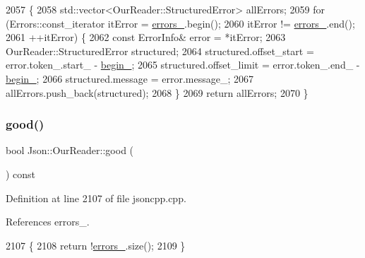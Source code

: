 \begin{DoxyCode}
2057                                                                          \{
2058   std::vector<OurReader::StructuredError> allErrors;
2059   \textcolor{keywordflow}{for} (Errors::const\_iterator itError = \hyperlink{class_json_1_1_our_reader_afb76b68ba1ab68fe09cf2838e3d4898d}{errors\_}.begin();
2060        itError != \hyperlink{class_json_1_1_our_reader_afb76b68ba1ab68fe09cf2838e3d4898d}{errors\_}.end();
2061        ++itError) \{
2062     \textcolor{keyword}{const} ErrorInfo& error = *itError;
2063     OurReader::StructuredError structured;
2064     structured.offset\_start = error.token\_.start\_ - \hyperlink{class_json_1_1_our_reader_a9bda9d72335d52cd06e65f9eca3f70f5}{begin\_};
2065     structured.offset\_limit = error.token\_.end\_ - \hyperlink{class_json_1_1_our_reader_a9bda9d72335d52cd06e65f9eca3f70f5}{begin\_};
2066     structured.message = error.message\_;
2067     allErrors.push\_back(structured);
2068   \}
2069   \textcolor{keywordflow}{return} allErrors;
2070 \}
\end{DoxyCode}
\mbox{\label{class_json_1_1_our_reader_a63c7d874fa379397e0a5fa65f0843845}} 
\subsubsection{\texorpdfstring{good()}{good()}}
{\footnotesize\ttfamily bool Json\+::\+Our\+Reader\+::good (\begin{DoxyParamCaption}{ }\end{DoxyParamCaption}) const}



Definition at line 2107 of file jsoncpp.\+cpp.



References errors\+\_\+.


\begin{DoxyCode}
2107                            \{
2108   \textcolor{keywordflow}{return} !\hyperlink{class_json_1_1_our_reader_afb76b68ba1ab68fe09cf2838e3d4898d}{errors\_}.size();
2109 \}
\end{DoxyCode}
\mbox{\label{class_json_1_1_our_reader_a4a03f1b266def9b47c4fef35386557fb}} 
